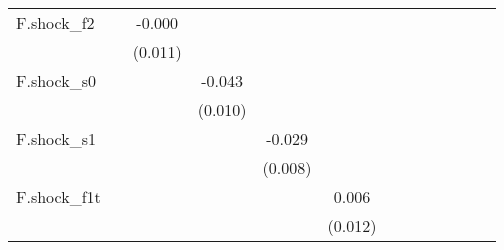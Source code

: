 {\begin{tabular}{l*{12}{c}}
\addlinespace
F.shock\_f2  &                     &      -0.000         &                     &                     &                     &                     &                     &                     &                     &                     &                     &                     \\
            &                     &     (0.011)         &                     &                     &                     &                     &                     &                     &                     &                     &                     &                     \\
\addlinespace
F.shock\_s0  &                     &                     &      -0.043\sym{***}&                     &                     &                     &                     &                     &                     &                     &                     &                     \\
            &                     &                     &     (0.010)         &                     &                     &                     &                     &                     &                     &                     &                     &                     \\
\addlinespace
F.shock\_s1  &                     &                     &                     &      -0.029\sym{***}&                     &                     &                     &                     &                     &                     &                     &                     \\
            &                     &                     &                     &     (0.008)         &                     &                     &                     &                     &                     &                     &                     &                     \\
\addlinespace
F.shock\_f1t &                     &                     &                     &                     &       0.006         &                     &                     &                     &                     &                     &                     &                     \\
            &                     &                     &                     &                     &     (0.012)         &                     &                     &                     &                     &                     &                     &                     \\

\end{tabular}}
